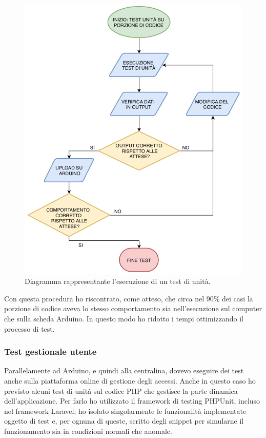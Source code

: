 \begin{figure}[H]
	\begin{center}
	\includegraphics[scale=0.6]{immagini/flow_chart.png}
	\caption{Diagramma rappresentante l'esecuzione di un test di unità.}
	\end{center}
\end{figure}

Con questa procedura ho riscontrato, come atteso, che circa nel 90\% dei casi la porzione di codice aveva lo stesso comportamento sia nell'esecuzione sul computer che sulla scheda Arduino. In questo modo ho ridotto i tempi ottimizzando il processo di test.

\subsubsection{Test gestionale utente}
Parallelamente ad Arduino, e quindi alla centralina, dovevo eseguire dei test anche sulla piattaforma online di gestione degli accessi.
Anche in questo caso ho previsto alcuni test di unità sul codice PHP che gestisce la parte dinamica dell'applicazione. Per farlo ho utilizzato il framework di testing PHPUnit, incluso nel framework Laravel; ho isolato singolarmente le funzionalità implementate oggetto di test e, per ognuna di queste, scritto degli snippet per simularne il funzionamento sia in condizioni normali che anomale.

